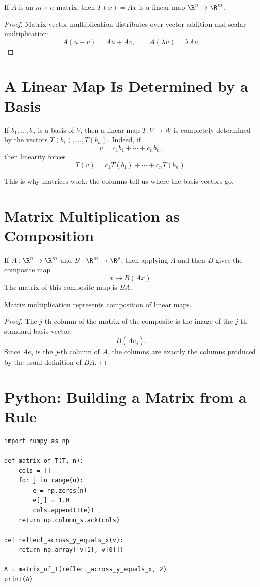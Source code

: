 \begin{proposition}
  If $A$ is an $m\times n$ matrix, then $T(x)=Ax$ is a linear map
  $\R^n\to\R^m$.
\end{proposition}

\begin{proof}
  Matrix-vector multiplication distributes over vector addition and scalar
  multiplication:
  \[
    A(u+v)=Au+Av,\qquad A(\lambda u)=\lambda Au.
  \]
\end{proof}

\section{A Linear Map Is Determined by a Basis}

If $b_1,\ldots,b_n$ is a basis of $V$, then a linear map $T:V\to W$ is
completely determined by the vectors $T(b_1),\ldots,T(b_n)$. Indeed, if
\[
  v=c_1b_1+\cdots+c_nb_n,
\]
then linearity forces
\[
  T(v)=c_1T(b_1)+\cdots+c_nT(b_n).
\]

This is why matrices work: the columns tell us where the basis vectors go.

\section{Matrix Multiplication as Composition}

If $A:\R^n\to\R^m$ and $B:\R^m\to\R^p$, then applying $A$ and then $B$ gives
the composite map
\[
  x\mapsto B(Ax).
\]
The matrix of this composite map is $BA$.

\begin{theorem}
  Matrix multiplication represents composition of linear maps.
\end{theorem}

\begin{proof}
  The $j$-th column of the matrix of the composite is the image of the $j$-th
  standard basis vector:
  \[
    B(Ae_j).
  \]
  Since $Ae_j$ is the $j$-th column of $A$, the columns are exactly the
  columns produced by the usual definition of $BA$.
\end{proof}

\section{Python: Building a Matrix from a Rule}

\begin{lstlisting}
import numpy as np

def matrix_of_T(T, n):
    cols = []
    for j in range(n):
        e = np.zeros(n)
        e[j] = 1.0
        cols.append(T(e))
    return np.column_stack(cols)

def reflect_across_y_equals_x(v):
    return np.array([v[1], v[0]])

A = matrix_of_T(reflect_across_y_equals_x, 2)
print(A)
\end{lstlisting}

